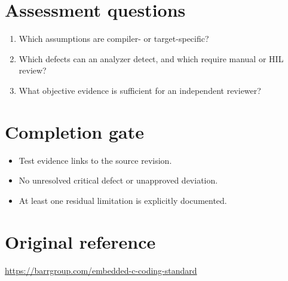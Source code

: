 \documentclass[10pt,letterpaper]{article}
\begin{document}
\section{Assessment questions}
\begin{enumerate}
\item Which assumptions are compiler- or target-specific?
\item Which defects can an analyzer detect, and which require manual or HIL review?
\item What objective evidence is sufficient for an independent reviewer?
\end{enumerate}

\section{Completion gate}
\begin{itemize}
\item Test evidence links to the source revision.
\item No unresolved critical defect or unapproved deviation.
\item At least one residual limitation is explicitly documented.
\end{itemize}

\section{Original reference}
\url{https://barrgroup.com/embedded-c-coding-standard}
\end{document}

